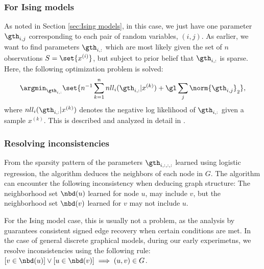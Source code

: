 \documentclass{article}
\begin{document}
\subsubsection{For Ising models}
As noted in Section \ref{sec:Ising models}, in this case, we just have one parameter $\gth_{i, j}$ corresponding to each pair of random variables, $(i, j)$. As earlier, we want to find parameters $\gth_{i, :}$ which are most likely given the set of $n$ observations $S = \set{x^{(i)}}$, but subject to prior belief that $\gth_{i, :}$ is sparse. Here, the following optimization problem is solved:
\begin{equation}
\argmin_{\gth_{i, :}} \set{n^{-1} \sum_{k=1}^{n}nll_i(\gth_{i, :} |x^{(k)}) + \gl \sum_{j} \norm{\gth_{i, j}}_2},
\label{eqn:optProblemLagrangianIsing}
\end{equation}
where $nll_i(\gth_{i, :}|x^{(k)})$ denotes the negative log likelihood of $\gth_{i, :}$ given a sample $x^{(k)}$. This is described and analyzed in detail in \citet{ravikumarIsing09}.


\subsubsection{Resolving inconsistencies}
From the sparsity pattern of the parameters $\gth_{i, :, :, :}$ learned using logistic regression, the algorithm deduces the neighbors of each node in $G$. The algorithm can encounter the following inconsistency when deducing graph structure: The neighborhood set $\nbd(u)$ learned for node $u$, may include $v$, but the neighborhood set $\nbd(v)$ learned for $v$ may not include $u$.

For the Ising model case, this is usually not a problem, as the analysis by \citet{ravikumarIsing09} guarantees consistent signed edge recovery when certain conditions are met. In the case of general discrete graphical models, during our early experimetns, we resolve inconsistencies using the following rule: $[v \in \nbd(u)] \lor [u \in \nbd(v)] \implies (u, v) \in G$.
\end{document}
